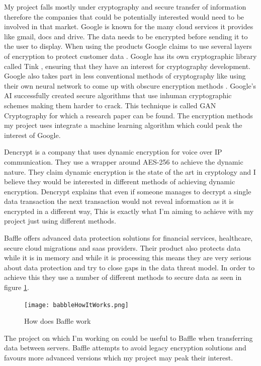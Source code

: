 %
%
%
%
My project falls mostly under cryptography and secure transfer of information therefore the companies that could be potentially interested would need to be involved in that market. 
Google is known for the many cloud services it provides like gmail, docs and drive. The data needs to be encrypted before sending it to the user to display. When using the products Google claims to use several layers of encryption to protect customer data \cite{googleSecurity}. Google has its own cryptographic library called Tink \cite{googleTink}, ensuring that they have an interest for cryptography development. Google also takes part in less conventional methods of cryptography like using their own neural network to come up with obscure encryption methods \cite{GoogleAi1}. Google's AI successfully created secure algorithms \cite{GoogleAi1} that use inhuman cryptographic schemes making them harder to crack. This technique is called GAN Cryptography \cite{GoogleAi2} for which a research paper can be found. The encryption methods my project uses integrate a machine learning algorithm which could peak the interest of Google.

Dencrypt \cite{dencrypt} is a company that uses dynamic encryption for voice over IP communication. They use a wrapper around AES-256 to achieve the dynamic nature. They claim dynamic encryption is the state of the art in cryptology and I believe they would be interested in different methods of achieving dynamic encryption. Dencrypt explains that even if someone manages to decrypt a single data transaction the next transaction would not reveal information as it is encrypted in a different way, This is exactly what I'm aiming to achieve with my project just using different methods. 

Baffle \cite{Company_baffle} offers advanced data protection solutions for financial services, healthcare, secure cloud migrations and saas providers. Their product also protects data while it is in memory and while it is processing this means they are very serious about data protection and try to close gaps in the data threat model. In order to achieve this they use a number of different methods to secure data as seen in figure \ref{fig:baffle}.
\begin{figure}[ht]
  \centering
      \texttt{[image: babbleHowItWorks.png]}
  \caption[How does Baffle work]{How does Baffle work\cite{Company_baffle}}
  \label{fig:baffle}
\end{figure}
The project on which I'm working on could be useful to Baffle when transferring data between servers. Baffle attempts to avoid legacy encryption solutions and favours more advanced versions which my project may peak their interest.

